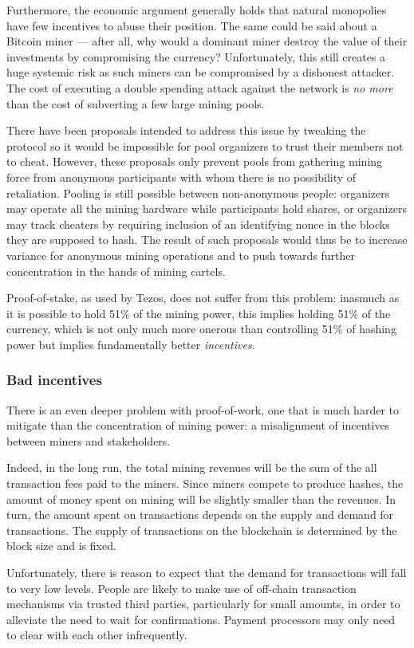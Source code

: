 \documentclass[letterpaper]{article}
\begin{document}
Furthermore, the economic argument generally holds that natural monopolies have
few incentives to abuse their position. The same could be said about a Bitcoin
miner --- after all, why would a dominant miner destroy the value of their
investments by compromising the currency?
Unfortunately, this still creates a huge systemic risk as such miners can be
compromised by a dishonest attacker. The cost of executing a double spending
attack against the network is \emph{no more} than the cost of subverting a few
large mining pools.

There have been proposals intended to address this issue by tweaking the
protocol so it would be impossible for pool organizers to trust their members
not to cheat. However, these proposals only prevent pools from gathering mining
force from anonymous participants with whom there is no possibility of
retaliation. Pooling is still possible between non-anonymous people:
organizers may operate all the mining hardware while participants hold shares,
or organizers may track cheaters by requiring inclusion of an identifying nonce
in the blocks they are supposed to hash. The result of such proposals would thus
be to increase variance for anonymous mining operations and to push towards
further concentration in the hands of mining cartels.

Proof-of-stake, as used by Tezos, does not suffer from this problem:
inasmuch as it is possible to hold 51\% of the mining power,
this implies holding 51\% of the currency,
which is not only much more onerous than controlling 51\% of hashing power but
implies fundamentally better \emph{incentives}.

\subsubsection{Bad incentives}
There is an even deeper problem with proof-of-work, one that is much harder to
mitigate than the concentration of mining power: a misalignment of incentives
between miners and stakeholders.

Indeed, in the long run, the total mining revenues will be the sum of the all
transaction fees paid to the miners. Since miners compete to produce hashes,
the amount of money spent on mining will be slightly smaller than the revenues.
In turn, the amount spent on transactions depends on the supply and demand for
transactions. The supply of transactions on the blockchain is determined by the
block size and is fixed.

Unfortunately, there is reason to expect that the demand for transactions will
fall to very low levels. People are likely to make use of off-chain transaction
mechanisms via trusted third parties, particularly for small amounts, in order
to alleviate the need to wait for confirmations. Payment processors may only
need to clear with each other infrequently.
\end{document}
